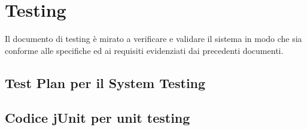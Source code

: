 %
%	 
%

\chapter{Testing}

Il documento di testing è mirato a verificare e validare il sistema in modo che sia 
conforme alle specifiche ed ai requisiti evidenziati dai precedenti documenti.

\section{Test Plan per il System Testing}

\section{Codice jUnit per unit testing}